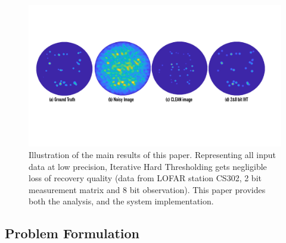 \documentclass[aoas,preprint]{imsart}
\numberwithin{equation}{section}
\theoremstyle{plain}
\begin{document}
\begin{figure}\label{sky_images}
  \centering
    \includegraphics[width=1\textwidth]{figs/sky_images_small.pdf}
  \caption{Illustration of the main results of this paper. Representing all input data at 
  low precision, Iterative Hard Thresholding gets negligible loss of recovery quality (data from LOFAR station CS302, 2 bit measurement matrix and 8 bit observation). This paper provides both  the analysis, and the system implementation.}
  \label{fig:sky_images}
\end{figure}
\vspace{0.5em}

\subsection{Problem Formulation}
\end{document}
